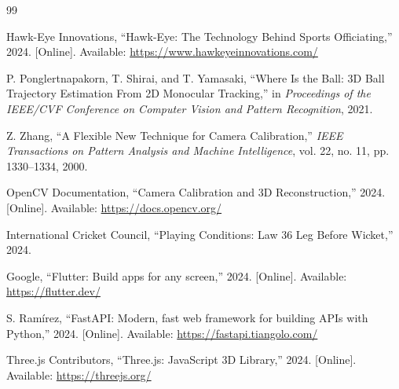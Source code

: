 \documentclass[12pt,a4paper]{article}
\begin{document}
\begin{thebibliography}{99}

Hawk-Eye Innovations, ``Hawk-Eye: The Technology Behind Sports Officiating,'' 2024. [Online]. Available: \url{https://www.hawkeyeinnovations.com/}

P. Ponglertnapakorn, T. Shirai, and T. Yamasaki, ``Where Is the Ball: 3D Ball Trajectory Estimation From 2D Monocular Tracking,'' in \textit{Proceedings of the IEEE/CVF Conference on Computer Vision and Pattern Recognition}, 2021.

Z. Zhang, ``A Flexible New Technique for Camera Calibration,'' \textit{IEEE Transactions on Pattern Analysis and Machine Intelligence}, vol. 22, no. 11, pp. 1330--1334, 2000.

OpenCV Documentation, ``Camera Calibration and 3D Reconstruction,'' 2024. [Online]. Available: \url{https://docs.opencv.org/}

International Cricket Council, ``Playing Conditions: Law 36 Leg Before Wicket,'' 2024.

Google, ``Flutter: Build apps for any screen,'' 2024. [Online]. Available: \url{https://flutter.dev/}

S. Ram\'{i}rez, ``FastAPI: Modern, fast web framework for building APIs with Python,'' 2024. [Online]. Available: \url{https://fastapi.tiangolo.com/}

Three.js Contributors, ``Three.js: JavaScript 3D Library,'' 2024. [Online]. Available: \url{https://threejs.org/}

\end{thebibliography}
\end{document}
